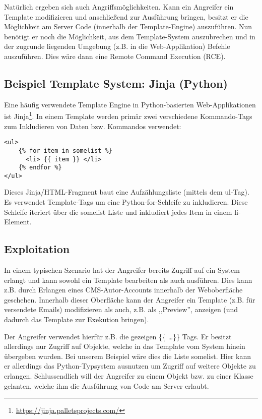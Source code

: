 Natürlich ergeben sich auch Angriffsmöglichkeiten. Kann ein Angreifer ein Template modifizieren und anschließend zur Ausführung bringen, besitzt er die Möglichkeit am Server Code (innerhalb der Template-Engine) auszuführen. Nun benötigt er noch die Möglichkeit, aus dem Template-System auszubrechen und in der zugrunde liegenden Umgebung (z.B. in die Web-Applikation) Befehle auszuführen. Dies wäre dann eine Remote Command Execution (RCE).

\subsection{Beispiel Template System: Jinja (Python)}

Eine häufig verwendete Template Engine in Python-basierten Web-Applikationen ist Jinja\footnote{\url{https://jinja.palletsprojects.com/}}. In einem Template werden primär zwei verschiedene Kommando-Tags zum Inkludieren von Daten bzw. Kommandos verwendet:

\begin{verbatim}
<ul>
	{% for item in somelist %}
	  <li> {{ item }} </li>
	{% endfor %}
</ul>
\end{verbatim}

Dieses Jinja/HTML-Fragment baut eine Aufzählungsliste (mittels dem ul-Tag). Es verwendet Template-Tags um eine Python-for-Schleife zu inkludieren. Diese Schleife iteriert über die somelist Liste und inkludiert jedes Item in einem li-Element.

\subsection{Exploitation}

In einem typischen Szenario hat der Angreifer bereits Zugriff auf ein System erlangt und kann sowohl ein Template bearbeiten als auch ausführen. Dies kann z.B. durch Erlangen eines CMS-Autor-Accounts innerhalb der Weboberfläche geschehen. Innerhalb dieser Oberfläche kann der Angreifer ein Template (z.B. für versendete Emails) modifizieren als auch, z.B. als ,,Preview'', anzeigen (und dadurch das Template zur Exekution bringen).

Der Angreifer verwendet hierfür z.B. die gezeigen \{\{ \ldots \}\} Tags. Er besitzt allerdings nur Zugriff auf Objekte, welche in das Template vom System hinein übergeben wurden. Bei unserem Beispiel wäre dies die Liste somelist. Hier kann er allerdings das Python-Typsystem ausnutzen um Zugriff auf weitere Objekte zu erlangen. Schlussendlich will der Angreifer zu einem Objekt bzw. zu einer Klasse gelanten, welche ihm die Ausführung von Code am Server erlaubt.

